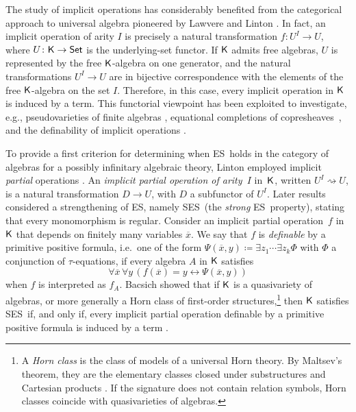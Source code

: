 \documentclass[a4paper,10pt,reqno]{amsart}
\theoremstyle{definition}
\theoremstyle{remark}
\newcommand{\Set}{{\sf Set}}							%
\newcommand{\K}{{\sf K}}								%
\newcommand{\ES}{\textnormal{ES}}
\newcommand{\SES}{\textnormal{SES}}
\begin{document}
The study of implicit operations has considerably benefited from the categorical approach to universal algebra pioneered by Lawvere and Linton \cite{Lawvere1963,Linton1966}. In fact, an implicit operation of arity $I$ is precisely a natural transformation $f\colon U^{I}\to U$, where $U\colon \K\to\Set$ is the underlying-set functor. 
If $\K$ admits free algebras, $U$ is represented by the free $\K$-algebra on one generator, and the natural transformations $U^{I}\to U$ are in bijective correspondence with the elements of the free $\K$-algebra on the set $I$. Therefore, in this case, every implicit operation in $\K$ is induced by a term.
This functorial viewpoint has been exploited to investigate, e.g., pseudovarieties of finite algebras \cite{RP1981,Reiterman1982}, equational completions of copresheaves~\cite{KG1971}, and the definability of implicit operations \cite{Isbell1973,Hodges1980,Isbell1983,Hebert1990}. 


%
To provide a first criterion for determining when \ES~holds in the category of algebras for a possibly infinitary algebraic theory, Linton employed implicit \emph{partial} operations \cite[Proposition~7]{Linton1966}. An \emph{implicit partial operation of arity~$I$} in~$\K$, written $U^I \rightsquigarrow U$, is a natural transformation $D\to U$, with $D$ a subfunctor of $U^{I}$. 
%
Later results considered a strengthening of \ES, namely \SES~(the \emph{strong} \ES~property), stating that every monomorphism is regular. 
Consider an implicit partial operation~$f$ in~$\K$ that depends on finitely many variables $\overline{x}$. We say that $f$ is \emph{definable} by a primitive positive formula, i.e.\ one of the form $\Psi(\overline{x},y)\coloneqq\exists z_{1}\cdots\exists z_{k}\Phi$ with $\Phi$ a conjunction of $\tau$-equations, if every algebra $A$ in $\K$ satisfies
\[
\forall \overline{x}\, \forall y \, (f(\overline{x})=y \leftrightarrow \Psi(\overline{x},y))
\]
when $f$ is interpreted as $f_{A}$.
%
Bacsich showed that if $\K$ is a quasivariety of algebras, or more generally a Horn class of first-order structures,\footnote{A \emph{Horn class} is the class of models of a universal Horn theory. By Maltsev's theorem, they are the elementary classes closed under substructures and Cartesian products \cite{Maltsev1966}. If the signature does not contain relation symbols, Horn classes coincide with quasivarieties of algebras.} then $\K$ satisfies \SES~if, and only if, every implicit partial operation definable by a primitive positive formula is induced by a term \cite[Theorem~4]{Bacsich74}. 
%
\end{document}
